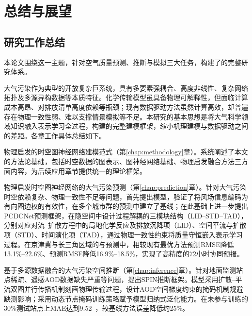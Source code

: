 
\chapter{总结与展望}
\label{chap:conclusion}


\section{研究工作总结}
\label{sec:summary}

本论文围绕这一主题，针对空气质量预测、推断与模拟三大任务，构建了的完整研究体系。

大气污染作为典型的开放复杂巨系统，具有多要素强耦合、高度非线性、复杂网络拓扑及多源异构数据等本质特征。化学传输模型虽具备物理可解释性，但面临计算成本高昂、对排放清单高度依赖等瓶颈；现有数据驱动方法虽然计算高效，却普遍存在物理一致性弱、难以支撑情景模拟等不足。本研究的基本思想是将大气科学领域知识融入表示学习全过程，构建的完整建模框架，缩小机理建模与数据驱动之间的差距。各章工作具体总结如下。

物理启发的时空图神经网络建模范式（第\ref{chap:methodology}章）。系统阐述了本文的方法论基础，包括时空数据的图表示、图神经网络基础、物理启发融合方法三方面内容，为后续应用章节提供统一的理论框架。

物理启发时空图神经网络的大气污染预测（第\ref{chap:prediction}章）。针对大气污染时空依赖复杂、物理一致性不足等问题，首先提出\ModelPred{}模型，验证了将风场信息编码为有向图边权的有效性，在多个城市群的\PM 预测中建立了基线；在此基础上进一步提出PCDCNet预测框架，在隐空间中设计过程解耦的三模块结构（LID--STD--TAD），分别对应对流--扩散方程中的局地化学反应及排放沉降项（LID）、空间平流与扩散项（STD）、时间演化项（TAD），通过物理一致性约束将质量守恒嵌入表示学习过程。在京津冀与长三角区域的\PM 与\ozone 预测中，相较现有最优方法\PM 预测RMSE降低13.1\%--22.6\%、\ozone 预测RMSE降低16.9\%--18.5\%，实现了高精度的72小时协同预报。

基于多源数据融合的大气污染空间推断（第\ref{chap:inference}章）。针对地面监测站点稀疏、遥感AOD数据缺失严重等问题，提出SPIN推断框架。模型采用扩散--平流双图并行传播机制刻画物理传输过程，设计AOD空间梯度约束的掩码机制规避缺测影响；采用动态节点掩码训练策略赋予模型归纳式泛化能力。在未参与训练的30\%测试站点上MAE达到9.52~\ug{}，较基线方法误差降低约25\%。

